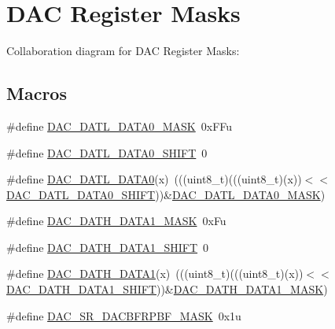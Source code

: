 \hypertarget{group___d_a_c___register___masks}{}\section{D\+AC Register Masks}
\label{group___d_a_c___register___masks}
Collaboration diagram for D\+AC Register Masks\+:
\subsection*{Macros}
\begin{DoxyCompactItemize}
\item 
\#define \hyperlink{group___d_a_c___register___masks_ga06d752efe9ec5bab7d61ccf9c2689345}{D\+A\+C\+\_\+\+D\+A\+T\+L\+\_\+\+D\+A\+T\+A0\+\_\+\+M\+A\+SK}~0x\+F\+Fu
\item 
\#define \hyperlink{group___d_a_c___register___masks_gad9030129a0f34502c115abd36728d001}{D\+A\+C\+\_\+\+D\+A\+T\+L\+\_\+\+D\+A\+T\+A0\+\_\+\+S\+H\+I\+FT}~0
\item 
\#define \hyperlink{group___d_a_c___register___masks_ga87995bd867b0ea7e137b5a5a8cbfdf1e}{D\+A\+C\+\_\+\+D\+A\+T\+L\+\_\+\+D\+A\+T\+A0}(x)~(((uint8\+\_\+t)(((uint8\+\_\+t)(x))$<$$<$\hyperlink{group___d_a_c___register___masks_gad9030129a0f34502c115abd36728d001}{D\+A\+C\+\_\+\+D\+A\+T\+L\+\_\+\+D\+A\+T\+A0\+\_\+\+S\+H\+I\+FT}))\&\hyperlink{group___d_a_c___register___masks_ga06d752efe9ec5bab7d61ccf9c2689345}{D\+A\+C\+\_\+\+D\+A\+T\+L\+\_\+\+D\+A\+T\+A0\+\_\+\+M\+A\+SK})
\item 
\#define \hyperlink{group___d_a_c___register___masks_ga98c0e999ae86d666b5d6fa8df700ba6f}{D\+A\+C\+\_\+\+D\+A\+T\+H\+\_\+\+D\+A\+T\+A1\+\_\+\+M\+A\+SK}~0x\+Fu
\item 
\#define \hyperlink{group___d_a_c___register___masks_ga0056432036b350d3839554982acfbff1}{D\+A\+C\+\_\+\+D\+A\+T\+H\+\_\+\+D\+A\+T\+A1\+\_\+\+S\+H\+I\+FT}~0
\item 
\#define \hyperlink{group___d_a_c___register___masks_ga22ebc926dfe59f28a37b532767780fbc}{D\+A\+C\+\_\+\+D\+A\+T\+H\+\_\+\+D\+A\+T\+A1}(x)~(((uint8\+\_\+t)(((uint8\+\_\+t)(x))$<$$<$\hyperlink{group___d_a_c___register___masks_ga0056432036b350d3839554982acfbff1}{D\+A\+C\+\_\+\+D\+A\+T\+H\+\_\+\+D\+A\+T\+A1\+\_\+\+S\+H\+I\+FT}))\&\hyperlink{group___d_a_c___register___masks_ga98c0e999ae86d666b5d6fa8df700ba6f}{D\+A\+C\+\_\+\+D\+A\+T\+H\+\_\+\+D\+A\+T\+A1\+\_\+\+M\+A\+SK})
\item 
\#define \hyperlink{group___d_a_c___register___masks_ga5af56fd75a9c5b74fe07c8f303d452aa}{D\+A\+C\+\_\+\+S\+R\+\_\+\+D\+A\+C\+B\+F\+R\+P\+B\+F\+\_\+\+M\+A\+SK}~0x1u

\end{DoxyCompactItemize}
